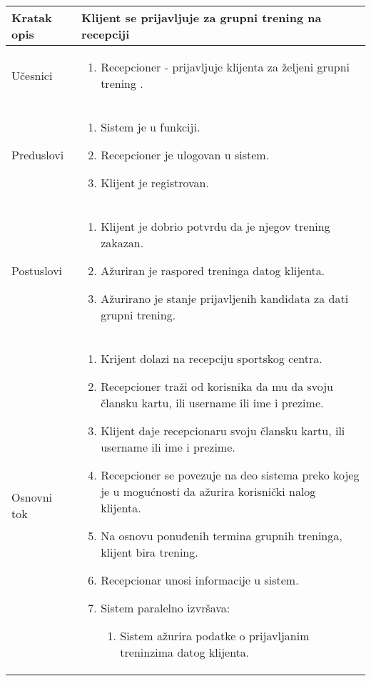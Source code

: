 \documentclass[../grupniTreninzi.tex]{subfiles}
\begin{document}
\begin{longtable}{| p{} | p{} |} 
\hline
    Kratak opis &  Klijent se prijavljuje za grupni trening na recepciji\\ 
\hline    
    Učesnici &
    \begin{enumerate}
        \item Recepcioner - prijavljuje klijenta za željeni grupni trening .
    \end{enumerate}\\
\hline
   Preduslovi & 
   \begin{enumerate}
        \item Sistem je u funkciji.
        \item Recepcioner je ulogovan u sistem.
        \item Klijent je registrovan.
    \end{enumerate}\\
\hline  
    Postuslovi &
    \begin{enumerate}
        \item Klijent je dobrio potvrdu da je njegov trening zakazan.
        \item Ažuriran je raspored treninga datog klijenta.
        \item Ažurirano je stanje prijavljenih kandidata za dati grupni trening.
    \end{enumerate}\\
\hline
    Osnovni tok & 
    \begin{enumerate}
        \item Krijent dolazi na recepciju sportskog centra.
        \item Recepcioner traži od korisnika da mu da svoju člansku kartu, ili username ili ime i prezime.
        \item Klijent daje recepcionaru svoju člansku kartu, ili username ili ime i prezime.
        \item Recepcioner se povezuje na deo sistema preko kojeg je u mogućnosti da ažurira korisnički nalog klijenta.
        \item Na osnovu ponuđenih termina grupnih treninga, klijent bira trening.
        \item Recepcionar unosi informacije u sistem.
        \item Sistem paralelno izvršava:
            \begin{enumerate}
                \item Sistem ažurira podatke o prijavljanim treninzima datog klijenta.

\end{enumerate}
\end{enumerate}
\end{longtable}
\end{document}
